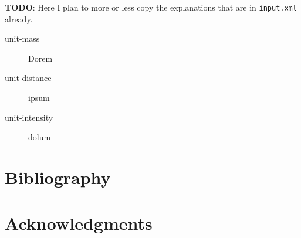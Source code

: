 \documentclass[a4paper, 12pt, english, titlepage]{article}
\begin{document}
    \textbf{TODO}: Here I plan to more or less copy the explanations that are in \texttt{input.xml} already.

    \begin{description}
        \item[unit-mass] Dorem
        \item[unit-distance] ipsum
        \item[unit-intensity] dolum
    \end{description}


\section{Bibliography}


\section{Acknowledgments}
\end{document}
